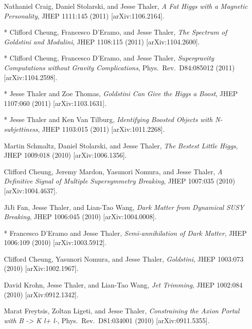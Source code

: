 \begin{list}{[]\addtocounter{jessecount}{-1}}{\leftmargin=3em \itemsep=4pt}
\item
 Nathaniel Craig, Daniel Stolarski, and Jesse Thaler,
\emph{A Fat Higgs with a Magnetic Personality},
JHEP 1111:145 (2011)
[arXiv:1106.2164].

\item
* Clifford Cheung, Francesco D'Eramo, and Jesse Thaler,
\emph{The Spectrum of Goldstini and Modulini},
JHEP 1108:115 (2011)
[arXiv:1104.2600].

\item
* Clifford Cheung, Francesco D'Eramo, and Jesse Thaler,
\emph{Supergravity Computations without Gravity Complications},
Phys.\ Rev.\ D84:085012 (2011)
[arXiv:1104.2598].

\item
* Jesse Thaler and Zoe Thomas,
\emph{Goldstini Can Give the Higgs a Boost},
JHEP 1107:060 (2011)
[arXiv:1103.1631].

\item
* Jesse Thaler and Ken Van Tilburg,
\emph{Identifying Boosted Objects with N-subjettiness},
JHEP 1103:015 (2011)
[arXiv:1011.2268].

\item
 Martin Schmaltz, Daniel Stolarski, and Jesse Thaler,
\emph{The Bestest Little Higgs},
JHEP 1009:018 (2010)
[arXiv:1006.1356].

\item
 Clifford Cheung, Jeremy Mardon, Yasunori Nomura, and Jesse Thaler,
\emph{A Definitive Signal of Multiple Supersymmetry Breaking},
JHEP 1007:035 (2010)
[arXiv:1004.4637].

\item
 JiJi Fan, Jesse Thaler, and Lian-Tao Wang,
\emph{Dark Matter from Dynamical SUSY Breaking},
JHEP 1006:045 (2010)
[arXiv:1004.0008].

\item
* Francesco D'Eramo and Jesse Thaler,
\emph{Semi-annihilation of Dark Matter},
JHEP 1006:109 (2010)
[arXiv:1003.5912].

\item
 Clifford Cheung, Yasunori Nomura, and Jesse Thaler,
\emph{Goldstini},
JHEP 1003:073 (2010)
[arXiv:1002.1967].

\item
 David Krohn, Jesse Thaler, and Lian-Tao Wang,
\emph{Jet Trimming},
JHEP 1002:084 (2010)
[arXiv:0912.1342].

\item
 Marat Freytsis, Zoltan Ligeti, and Jesse Thaler,
\emph{Constraining the Axion Portal with B -> K l+ l-},
Phys.\ Rev.\ D81:034001 (2010)
[arXiv:0911.5355].


\end{list}
